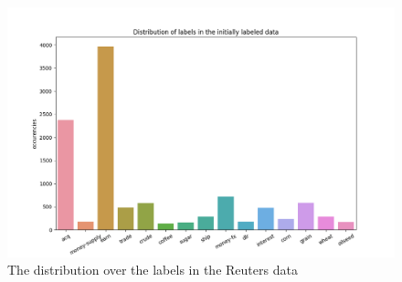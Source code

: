 \begin{figure}
    \includegraphics[scale=0.6]{figures/class-distribution-reuters.png}
    \caption{The distribution over the labels in the Reuters data}
    \label{fig:class-distribution-reuters}
\end{figure}

